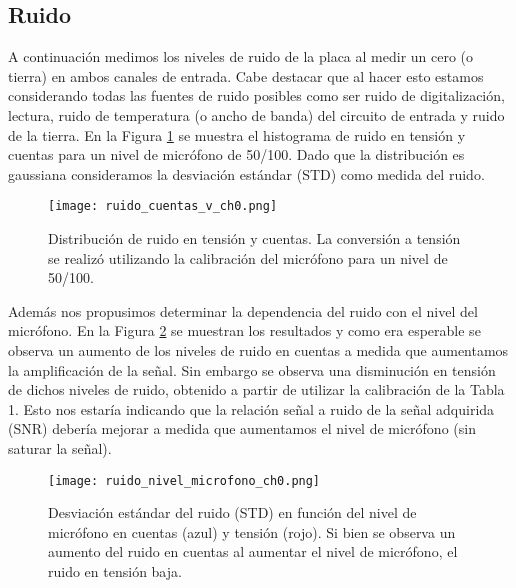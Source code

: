 \documentclass[a4paper, 11pt]{article}
\begin{document}
\subsection*{Ruido}
A continuación medimos los niveles de ruido de la placa al medir un cero (o tierra) en ambos canales de entrada. Cabe destacar que al hacer esto estamos considerando todas las fuentes de ruido posibles como ser ruido de digitalización, lectura, ruido de temperatura (o ancho de banda) del circuito de entrada y ruido de la tierra.  En la Figura \ref{fig:ruidocuentas} se muestra el histograma de ruido en tensión y cuentas para un nivel de micrófono de 50/100. Dado que la distribución es gaussiana consideramos la desviación estándar (STD) como medida del ruido.
\begin{figure} [H]
\centering
\texttt{[image: ruido\_cuentas\_v\_ch0.png]}
\caption{Distribución de ruido en tensión y cuentas. La conversión a tensión se realizó utilizando la calibración del micrófono para un nivel de 50/100.\label{fig:ruidocuentas}}
\end{figure} 

Además nos propusimos determinar la dependencia del ruido con el nivel del micrófono. En la Figura \ref{fig:ruidomic}  se muestran los resultados y como era esperable se observa un aumento de los niveles de ruido en cuentas a medida que aumentamos la amplificación de la señal. Sin embargo se observa una disminución en tensión de dichos niveles de ruido, obtenido a partir de utilizar la calibración de la Tabla 1. Esto nos estaría indicando que la relación señal a ruido de la señal adquirida (SNR) debería mejorar a medida que aumentamos el nivel de micrófono (sin saturar la señal).

\begin{figure} [H]
\centering
\texttt{[image: ruido\_nivel\_microfono\_ch0.png]}
\caption{Desviación estándar del ruido (STD) en función del nivel de micrófono en cuentas (azul) y tensión (rojo). Si bien se observa un aumento del ruido en cuentas al aumentar el nivel de micrófono, el ruido en tensión baja. \label{fig:ruidomic}}
\end{figure} 
\end{document}
